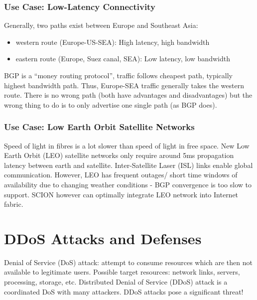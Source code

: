 \documentclass[11pt,oneside,a4paper]{article}
\begin{document}
\subsubsection{Use Case: Low-Latency Connectivity}

Generally, two paths exist between Europe and Southeast Asia: 

\vspace{-\topsep}
\begin{itemize}
	\setlength{\itemsep}{0pt}
	\setlength{\parskip}{0pt}
	\item western route (Europe-US-SEA): High latency, high bandwidth
	\item eastern route (Europe, Suez canal, SEA): Low latency, low bandwidth
\end{itemize}
\vspace{-\topsep}

\noindent BGP is a “money routing protocol”, traffic follows cheapest path, typically highest bandwidth path. Thus, Europe-SEA traffic generally takes the western route. There is no wrong path (both have advantages and disadvantages) but the wrong thing to do is to only advertise one single path (as BGP does).

\subsubsection{Use Case: Low Earth Orbit Satellite Networks}

Speed of light in fibres is a lot slower than speed of light in free space. New Low Earth Orbit (LEO) satellite networks only require around 5ms propagation latency between earth and satellite. Inter-Satellite Laser (ISL) links enable global communication. However, LEO has frequent outages/ short time windows of availability due to changing weather conditions - BGP convergence is too slow to support. SCION however can optimally integrate LEO network into Internet fabric.


\newpage

\section{DDoS Attacks and Defenses}
\label{ddos}

Denial of Service (DoS) attack: attempt to consume resources which are then not available to legitimate users. Possible target resources: network links, servers, processing, storage, etc. Distributed Denial of Service (DDoS) attack is a coordinated DoS with many attackers. DDoS attacks pose a significant threat!
\end{document}
